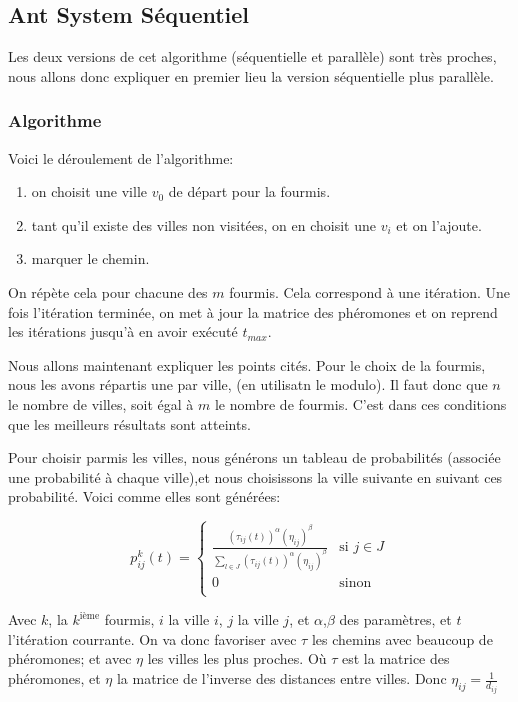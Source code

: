 \documentclass[a4paper, 11pt]{article}
\begin{document}
\subsection{Ant System Séquentiel}
Les deux versions de cet algorithme (séquentielle et parallèle) sont très proches, nous allons donc expliquer en premier lieu 
la version séquentielle plus parallèle.

\subsubsection{Algorithme}
Voici le déroulement de l'algorithme:
\begin{enumerate}
 \item on choisit une ville $v_0$ de départ pour la fourmis.
 \item tant qu'il existe des villes non visitées, on en choisit une $v_i$ et on l'ajoute.
 \item marquer le chemin.
\end{enumerate}

On répète cela pour chacune des $m$ fourmis. Cela correspond à une itération.
Une fois l'itération terminée, on met à jour la matrice des phéromones et on reprend les itérations jusqu'à en avoir exécuté $t_{max}$.

Nous allons maintenant expliquer les points cités.
Pour le choix de la fourmis, nous les avons répartis une par ville, (en utilisatn le modulo). Il faut donc que $n$ le nombre de villes, 
soit égal à $m$ le nombre de fourmis. C'est dans ces conditions que les meilleurs résultats sont atteints.

Pour choisir parmis les villes, nous générons un tableau de probabilités (associée une probabilité à chaque ville),et nous choisissons 
la ville suivante en suivant ces probabilité.
Voici comme elles sont générées:
 \begin{center}
  \begin{displaymath}
    p_{ij}^k(t) = 
    \left\lbrace
      \begin{array}{ll}
	\frac{(\tau_{ij}(t))^{\alpha} (\eta_{ij})^{\beta}}{\sum_{l \in J} (\tau_{ij}(t))^{\alpha} (\eta_{ij})^{\beta}} & \text{si } 
	j \in J \\
	0 & \text{sinon } \\
      \end{array}
    \right.
\end{displaymath}
 \end{center}

Avec $k$, la $k^{\text{ième}}$ fourmis, $i$ la ville $i$, $j$ la ville $j$, et $\alpha$,$\beta$ des paramètres, et $t$ l'itération courrante.
On va donc favoriser avec $\tau$ les chemins avec beaucoup de phéromones; et avec $\eta$ les villes les plus proches.
Où $\tau$ est la matrice des phéromones, et $\eta$ la matrice de l'inverse des distances entre villes. Donc $\eta_{ij} = \frac{1}{d_{ij}}$
\end{document}
